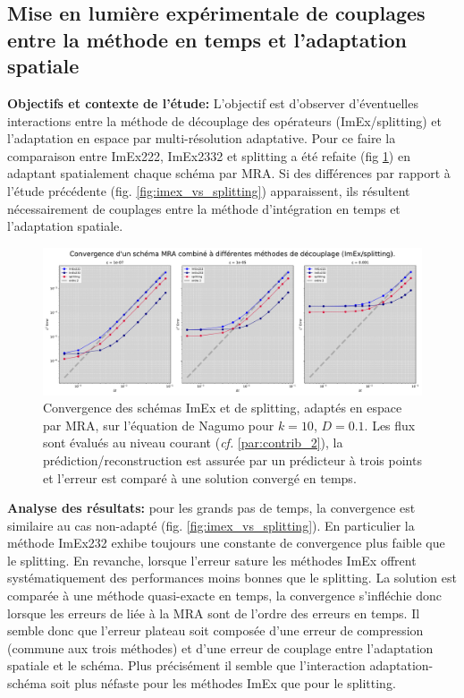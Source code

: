 \subsection{Mise en lumière expérimentale de couplages entre la méthode en temps et l'adaptation spatiale}
\label{par:couplagetempsadaptation}
\textbf{Objectifs et contexte de l'étude: }
L'objectif est d'observer d'éventuelles interactions entre la méthode de découplage des opérateurs (ImEx/splitting) et l'adaptation en espace par multi-résolution adaptative.
Pour ce faire la comparaison entre ImEx222, ImEx2332 et splitting a été refaite (fig \ref{fig:couplage-MRA-temps}) en adaptant spatialement chaque schéma par MRA.
Si des différences par rapport à l'étude précédente (fig. \ref{fig:imex_vs_splitting}) apparaissent, ils résultent nécessairement de couplages entre la méthode d'intégration en temps
et l'adaptation spatiale.\par
\begin{figure}[htbp!]
    \centering
    \includegraphics[width=\linewidth]{media/4_travail/2_nagumo/couplage/couplage_MRA_temps.pdf}
    \caption{Convergence des schémas ImEx et de splitting, adaptés en espace par MRA, sur l'équation de Nagumo pour $k=10$, $D=0.1$.
    Les flux sont évalués au niveau courant (\textit{cf.} \ref{par:contrib_2}), la prédiction/reconstruction est assurée par un prédicteur à trois points et l'erreur est comparé à une solution convergé en temps.}
    \label{fig:couplage-MRA-temps}
\end{figure}
\textbf{Analyse des résultats:} pour les grands pas de temps, la convergence est similaire au cas non-adapté (fig. \ref{fig:imex_vs_splitting}). En particulier la méthode
ImEx232 exhibe toujours une constante de convergence plus faible que le splitting. 
En revanche, lorsque l'erreur sature les méthodes ImEx offrent systématiquement des performances moins bonnes que le splitting.
La solution est comparée à une méthode quasi-exacte en temps, la convergence s'infléchie donc lorsque les erreurs de liée à la MRA sont de l'ordre des erreurs en temps.
Il semble donc que l'erreur plateau soit composée d'une erreur de compression (commune aux trois méthodes) et d'une erreur de couplage entre l'adaptation spatiale
et le schéma. Plus précisément il semble que l'interaction adaptation-schéma soit plus néfaste pour les méthodes ImEx que pour le splitting.\\
